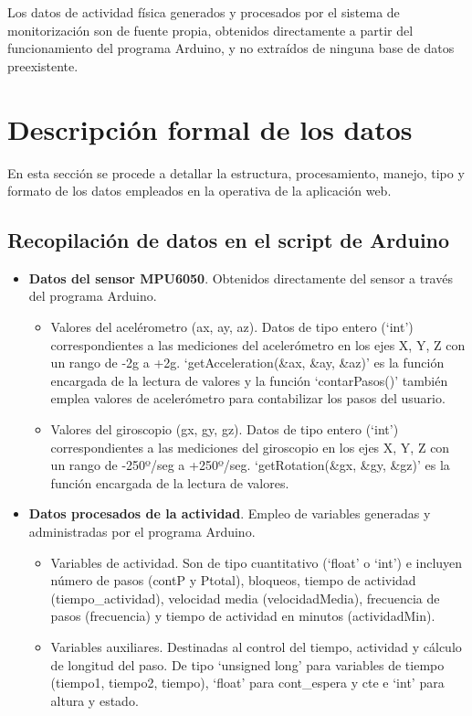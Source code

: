 
Los datos de actividad física generados y procesados por el sistema de monitorización son de fuente propia, obtenidos directamente a partir del funcionamiento del programa Arduino, y no extraídos de ninguna base de datos preexistente.

\section{Descripción formal de los datos}

En esta sección se procede a detallar la estructura, procesamiento, manejo, tipo y formato de los datos empleados en la operativa de la aplicación web.

\subsection{Recopilación de datos en el script de Arduino}
\begin{itemize}
    \item \textbf{Datos del sensor MPU6050}. Obtenidos directamente del sensor a través del programa Arduino.
    \begin{itemize}
        \item Valores del acelérometro (ax, ay, az). Datos de tipo entero (`int') correspondientes a las mediciones del acelerómetro en los ejes X, Y, Z con un rango de -2g a +2g. `getAcceleration(\&ax, \&ay, \&az)' es la función encargada de la lectura de valores y la función `contarPasos()' también emplea valores de acelerómetro para contabilizar los pasos del usuario.
        \item Valores del giroscopio (gx, gy, gz). Datos de tipo entero (`int') correspondientes a las mediciones del giroscopio en los ejes X, Y, Z con un rango de -250º/seg a +250º/seg. `getRotation(\&gx, \&gy, \&gz)' es la función encargada de la lectura de valores.
    \end{itemize}
    \item \textbf{Datos procesados de la actividad}. Empleo de variables generadas y administradas por el programa Arduino.
    \begin{itemize}
        \item Variables de actividad. Son de tipo cuantitativo (`float' o `int') e incluyen número de pasos (contP y Ptotal), bloqueos, tiempo de actividad (tiempo\_actividad), velocidad media (velocidadMedia), frecuencia de pasos (frecuencia) y tiempo de actividad en minutos (actividadMin). 
        \item Variables auxiliares. Destinadas al control del tiempo, actividad y cálculo de longitud del paso. De tipo `unsigned long' para variables de tiempo (tiempo1, tiempo2, tiempo), `float' para cont\_espera y cte e `int' para altura y estado.
    \end{itemize}
    
\end{itemize}


